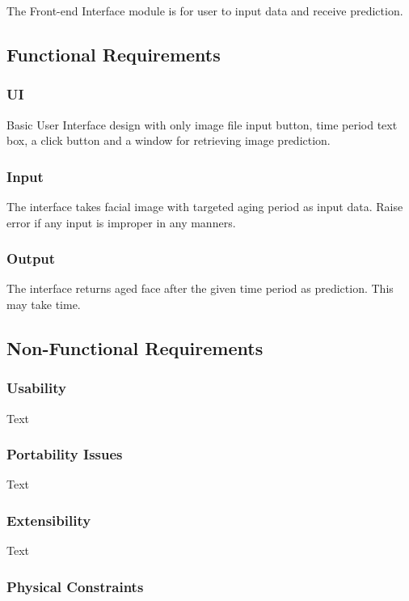 \documentclass[12pt]{article}
\begin{document}
\noindent The Front-end Interface module is for user to input data and receive prediction.

\subsection{Functional Requirements}
\subsubsection{UI}
Basic User Interface design with only image file input button, time period text box, a click button and a window for retrieving image prediction.
\subsubsection{Input}\label{input}
The interface takes facial image with targeted aging period as input data. Raise error if any input is improper in any manners.
\subsubsection{Output}
The interface returns aged face after the given time period as prediction. This may take time.

\subsection{Non-Functional Requirements}

\subsubsection {Usability}

Text

\subsubsection {Portability Issues}

Text

\subsubsection {Extensibility}
 
Text

\subsubsection {Physical Constraints}
\end{document}

